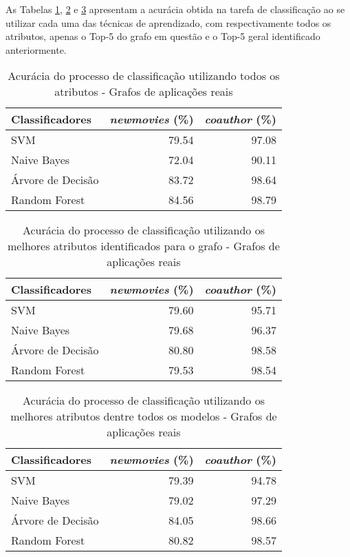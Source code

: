 \documentclass[a4paper,11pt]{article}
\begin{document}


As Tabelas \ref{tab:acctopallattrreal}, \ref{tab:acctopgraphreal} e \ref{tab:acctopallreal} apresentam a acurácia obtida na tarefa de classificação ao se utilizar cada uma das técnicas de aprendizado, com respectivamente todos os atributos, apenas o Top-5 do grafo em questão e o Top-5 geral identificado anteriormente. 

\begin{table}[htbp]
\caption{Acurácia do processo de classificação utilizando todos os atributos - Grafos de aplicações reais}
\center
\begin{tabular}{|l|r|r|}
\hline
Classificadores & \multicolumn{1}{l|}{\textit{newmovies} (\%)} & \multicolumn{1}{l|}{\textit{coauthor} (\%)} \\ \hline \hline
SVM & 79.54 & 97.08 \\ \hline
Naive Bayes & 72.04 & 90.11 \\ \hline
Árvore de Decisão & 83.72 & 98.64 \\ \hline
Random Forest & 84.56 & 98.79 \\ \hline
\end{tabular}
\label{tab:acctopallattrreal}
\end{table}


\begin{table}[htbp]
\caption{Acurácia do processo de classificação utilizando os melhores atributos identificados para o grafo - Grafos de aplicações reais}
\center
\begin{tabular}{|l|r|r|}
\hline
Classificadores & \multicolumn{1}{l|}{\textit{newmovies} (\%)} & \multicolumn{1}{l|}{\textit{coauthor} (\%)} \\ \hline \hline
SVM & 79.60 & 95.71 \\ \hline
Naive Bayes & 79.68 & 96.37 \\ \hline
Árvore de Decisão & 80.80 & 98.58 \\ \hline
Random Forest & 79.53 & 98.54 \\ \hline
\end{tabular}
\label{tab:acctopgraphreal}
\end{table}

\begin{table}[htbp]
\caption{Acurácia do processo de classificação utilizando os melhores atributos dentre todos os modelos - Grafos de aplicações reais}
\center
\begin{tabular}{|l|r|r|}
\hline
Classificadores & \multicolumn{1}{l|}{\textit{newmovies} (\%)} & \multicolumn{1}{l|}{\textit{coauthor} (\%)} \\ \hline
SVM & 79.39 & 94.78 \\ \hline
Naive Bayes & 79.02 & 97.29 \\ \hline
Árvore de Decisão & 84.05 & 98.66 \\ \hline
Random Forest & 80.82 & 98.57 \\ \hline
\end{tabular}
\label{tab:acctopallreal}
\end{table}
\end{document}
